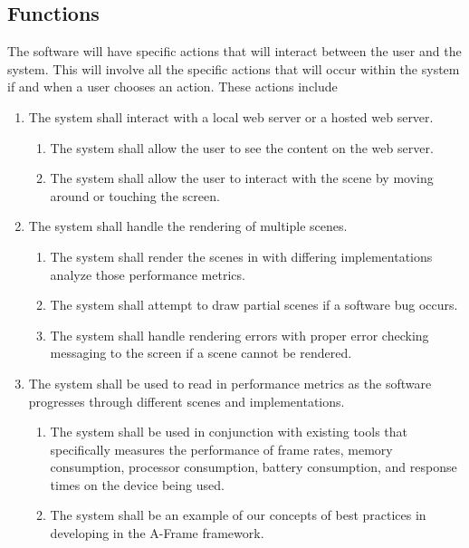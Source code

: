 \documentclass[letterpaper,10pt,draftclsnofoot,onecolumn,compsoc]{IEEEtran}
\begin{document}
\begin{singlespace}
\begin{singlespace}
\end{singlespace}

\subsection{Functions}
\begin{singlespace}
\noindent
The software will have specific actions that will interact between the user and the system. This will involve all the specific actions that will occur within the system if and when a user chooses an action. These actions include \\
\end{singlespace}
\begin{enumerate}[labelsep=2em,leftmargin=.5in]
    \item The system shall interact with a local web server or a hosted web server. 
    \begin{enumerate}[leftmargin=*,labelindent=0pt]
        \item The system shall allow the user to see the content on the web server.
        \item The system shall allow the user to interact with the scene by moving around or touching the screen.
    \end{enumerate}
    \item The system shall handle the rendering of multiple scenes.
    \begin{enumerate}[leftmargin=*,labelindent=0pt]
        \item The system shall render the scenes in with differing implementations analyze those performance metrics.
        \item The system shall attempt to draw partial scenes if a software bug occurs.
        \item The system shall handle rendering errors with proper error checking messaging to the screen if a scene cannot be rendered.
    \end{enumerate}
    \item The system shall be used to read in performance metrics as the software progresses through different scenes and implementations.
    \begin{enumerate}[leftmargin=*,labelindent=0pt]
        \item The system shall be used in conjunction with existing tools that specifically measures the performance of frame rates, memory consumption, processor consumption, battery consumption, and response times on the device being used.
        \item The system shall be an example of our concepts of best practices in developing in the A-Frame framework.
    \end{enumerate}
\end{enumerate}


\end{singlespace}
\end{document}
